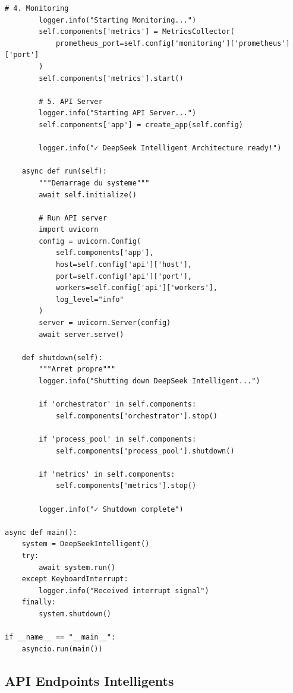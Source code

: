 \documentclass[12pt,a4paper]{article}
\begin{document}
\begin{lstlisting}[caption={start\_intelligent.py}]
        # 4. Monitoring
        logger.info("Starting Monitoring...")
        self.components['metrics'] = MetricsCollector(
            prometheus_port=self.config['monitoring']['prometheus']['port']
        )
        self.components['metrics'].start()
        
        # 5. API Server
        logger.info("Starting API Server...")
        self.components['app'] = create_app(self.config)
        
        logger.info("✓ DeepSeek Intelligent Architecture ready!")
        
    async def run(self):
        """Demarrage du systeme"""
        await self.initialize()
        
        # Run API server
        import uvicorn
        config = uvicorn.Config(
            self.components['app'],
            host=self.config['api']['host'],
            port=self.config['api']['port'],
            workers=self.config['api']['workers'],
            log_level="info"
        )
        server = uvicorn.Server(config)
        await server.serve()
        
    def shutdown(self):
        """Arret propre"""
        logger.info("Shutting down DeepSeek Intelligent...")
        
        if 'orchestrator' in self.components:
            self.components['orchestrator'].stop()
            
        if 'process_pool' in self.components:
            self.components['process_pool'].shutdown()
            
        if 'metrics' in self.components:
            self.components['metrics'].stop()
            
        logger.info("✓ Shutdown complete")

async def main():
    system = DeepSeekIntelligent()
    try:
        await system.run()
    except KeyboardInterrupt:
        logger.info("Received interrupt signal")
    finally:
        system.shutdown()

if __name__ == "__main__":
    asyncio.run(main())
\end{lstlisting}

\subsection{API Endpoints Intelligents}
\end{document}
